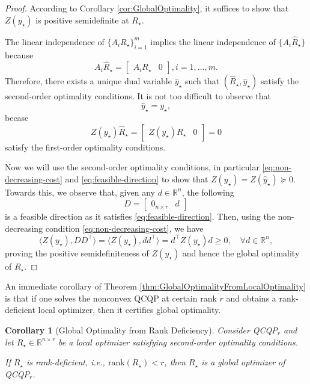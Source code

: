\documentclass[
]{book}
\newtheorem{corollary}{Corollary}[chapter]
\theoremstyle{definition}
\theoremstyle{definition}
\theoremstyle{definition}
\theoremstyle{definition}
\theoremstyle{remark}
\begin{document}
\begin{proof}
According to Corollary \ref{cor:GlobalOptimality}, it suffices to show that \(Z(y_\star)\) is positive semidefinite at \(R_\star\).

The linear independence of \(\{ A_i R_\star \}_{i=1}^m\) implies the linear independence of \(\{ A_i \hat{R}_\star \}\) because
\[
A_i \hat{R}_\star = \begin{bmatrix} A_i R_\star & 0 \end{bmatrix}, i=1,\dots,m.
\]
Therefore, there exists a unique dual variable \(\hat{y}_\star\) such that \((\hat{R}_\star, \hat{y}_\star)\) satisfy the second-order optimality conditions. It is not too difficult to observe that
\[
\hat{y}_\star = y_\star,
\]
becase
\[
Z(y_\star) \hat{R}_\star = \begin{bmatrix}
Z(y_\star) R_\star & 0
\end{bmatrix} = 0
\]
satisfy the first-order optimality conditions.

Now we will use the second-order optimality conditions, in particular \eqref{eq:non-decreasing-cost} and \eqref{eq:feasible-direction} to show that \(Z(y_\star) = Z(\hat{y}_\star) \succeq 0\). Towards this, we observe that, given any \(d \in \mathbb{R}^{n}\), the following
\[
D = \begin{bmatrix}
0_{n \times r} & d
\end{bmatrix}
\]
is a feasible direction as it satisfies \eqref{eq:feasible-direction}. Then, using the non-decreasing condition \eqref{eq:non-decreasing-cost}, we have
\[
\langle Z(y_\star), DD^\top \rangle = \langle Z(y_\star), dd^\top \rangle = d^\top Z(y_\star) d \geq 0, \quad \forall d \in \mathbb{R}^{n},
\]
proving the positive semidefiniteness of \(Z(y_\star)\) and hence the global optimality of \(R_\star\).
\end{proof}

An immediate corollary of Theorem \ref{thm:GlobalOptimalityFromLocalOptimality} is that if one solves the nonconvex QCQP at certain rank \(r\) and obtains a rank-deficient local optimizer, then it certifies global optimality.

\begin{corollary}[Global Optimality from Rank Deficiency]
\protect\hypertarget{cor:RankDeficient}{}\label{cor:RankDeficient}Consider QCQP\(_r\) and let \(R_\star \in \mathbb{R}^{n \times r}\) be a local optimizer satisfying second-order optimality conditions.

If \(R_\star\) is rank-deficient, i.e., \(\mathrm{rank}(R_\star) < r\), then \(R_\star\) is a global optimizer of QCQP\(_r\).
\end{corollary}
\end{document}
